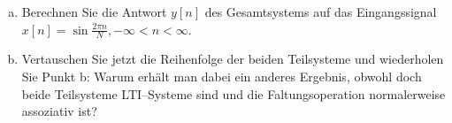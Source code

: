 \begin{uebsp}
\begin{Answer}
\begin{enumerate}[a)]
\begin{enumerate}
\begin{eqnarray*}
                                \left(\cancel{2j}\csc\left(\frac{\pi}{N}\right)\sin
                                \left(\frac{\pi
                                (n+1)}{N}\right)\sin\left(\frac{\pi(n+2)}{N}\right)\right)\right)\\
                            h[n]&=&2\sin\frac{\pi}{N}\left(
                                \left(\csc\left(\frac{\pi}{N}\right)\sin
                                \left(\frac{\pi
                                n}{N}\right)\sin\left(\frac{\pi(n+1)}{N}\right)\right)-
                                \left(\csc\left(\frac{\pi}{N}\right)\sin
                                \left(\frac{\pi
                                (n+1)}{N}\right)\sin\left(\frac{\pi(n+2)}{N}\right)\right)\right)\\
                            &\Rightarrow&\fbox{Mit $\csc(x)=\frac{1}{sin(x)}$
                            folgt:}\\
                            h[n]&=&2\cancel{\sin\frac{\pi}{N}}\left(
                                \left(\frac{1}{\cancel{sin\left(\frac{\pi}{N}\right)}}\sin
                                \left(\frac{\pi
                                n}{N}\right)\sin\left(\frac{\pi(n+1)}{N}\right)\right)-
                                \left(\frac{1}{\cancel{sin\left(\frac{\pi}{N}\right)}}\sin
                                \left(\frac{\pi
                                (n+1)}{N}\right)\sin\left(\frac{\pi(n+2)}{N}\right)\right)\right)\\
                            h[n]&=&2\left(
                                \left(\sin
                                \left(\frac{\pi
                                n}{N}\right)\sin\left(\frac{\pi(n+1)}{N}\right)\right)-
                                \left(\sin
                                \left(\frac{\pi
                                (n+1)}{N}\right)\sin\left(\frac{\pi(n+2)}{N}\right)\right)\right)\\
                \end{eqnarray*}
        \end{enumerate}
    \item Berechnen Sie die Antwort $y[n]$ des Gesamtsystems auf das
    Eingangssignal $x[n] = \sin\frac{2\pi n}{N}, -\infty < n < \infty$.
    \item Vertauschen Sie jetzt die Reihenfolge der beiden Teilsysteme und
    wiederholen Sie Punkt b: Warum erhält man dabei ein anderes Ergebnis, 
    obwohl doch beide Teilsysteme LTI–Systeme sind und die Faltungsoperation 
    normalerweise assoziativ ist?
\end{enumerate}
\end{Answer}
\end{uebsp}
